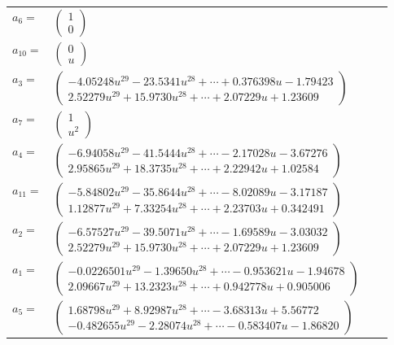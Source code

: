 \documentclass[1p]{elsarticle_modified}
\theoremstyle{definition}
\begin{document}
\begin{tabular}{m{7pt} m{180pt} m{7pt} m{180pt} }
\flushright $a_{6}=$&$\begin{pmatrix}1\\0\end{pmatrix}$ \\
\flushright $a_{10}=$&$\begin{pmatrix}0\\u\end{pmatrix}$ \\
\flushright $a_{3}=$&$\begin{pmatrix}-4.05248 u^{29}-23.5341 u^{28}+\cdots+0.376398 u-1.79423\\2.52279 u^{29}+15.9730 u^{28}+\cdots+2.07229 u+1.23609\end{pmatrix}$ \\
\flushright $a_{7}=$&$\begin{pmatrix}1\\u^2\end{pmatrix}$ \\
\flushright $a_{4}=$&$\begin{pmatrix}-6.94058 u^{29}-41.5444 u^{28}+\cdots-2.17028 u-3.67276\\2.95865 u^{29}+18.3735 u^{28}+\cdots+2.22942 u+1.02584\end{pmatrix}$ \\
\flushright $a_{11}=$&$\begin{pmatrix}-5.84802 u^{29}-35.8644 u^{28}+\cdots-8.02089 u-3.17187\\1.12877 u^{29}+7.33254 u^{28}+\cdots+2.23703 u+0.342491\end{pmatrix}$ \\
\flushright $a_{2}=$&$\begin{pmatrix}-6.57527 u^{29}-39.5071 u^{28}+\cdots-1.69589 u-3.03032\\2.52279 u^{29}+15.9730 u^{28}+\cdots+2.07229 u+1.23609\end{pmatrix}$ \\
\flushright $a_{1}=$&$\begin{pmatrix}-0.0226501 u^{29}-1.39650 u^{28}+\cdots-0.953621 u-1.94678\\2.09667 u^{29}+13.2323 u^{28}+\cdots+0.942778 u+0.905006\end{pmatrix}$ \\
\flushright $a_{5}=$&$\begin{pmatrix}1.68798 u^{29}+8.92987 u^{28}+\cdots-3.68313 u+5.56772\\-0.482655 u^{29}-2.28074 u^{28}+\cdots-0.583407 u-1.86820\end{pmatrix}$ \\

\end{tabular}
\end{document}
